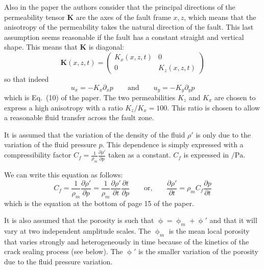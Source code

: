 Also in the paper the authors consider that the principal directions of the permeability
tensor ${\bm K}$ are the axes of the fault frame $x,z$, which means
that the anisotropy of the permeability takes the natural
direction of the fault. This last assumption seems reasonable
if the fault has a constant straight and vertical shape.
This means that ${\bm K}$ is diagonal:
\begin{equation}
{\bm K}(x,z,t) = \left(\begin{array}{cc}
K_x(x,z,t) & 0 \\ 
0 & K_z(x,z,t)
\end{array}\right)
\label{eq:por22}
\end{equation}
so that indeed
\begin{equation}
u_x = -K_x \partial_x p
\qquad
\text{and}
\qquad
u_y = -K_y \partial_y p
\label{eq:por11}
\end{equation}
which is Eq.~(10) of the paper.
The two permeabilities $K_z$ and $K_x$ are chosen to express a high anisotropy with a ratio 
$K_z/K_x =100$. This ratio is chosen to allow a reasonable fluid transfer across the fault zone.

It is assumed that the variation of the density of the fluid $\rho'$ 
is only due to the variation of the fluid pressure $p$. This dependence is simply
expressed with a compressibility factor $C_f = \frac{1}{\rho_m}\frac{\partial \rho'}{\partial p} $
taken as a constant. $C_f$ is expressed in $\si{\per\pascal}$.

We can write this equation as follows:
\begin{equation}
C_f = \frac{1}{\rho_m}\frac{\partial \rho'}{\partial p} = 
\frac{1}{\rho_m}\frac{\partial \rho'}{\partial t}\frac{\partial t}{\partial p}
\qquad
\text{or,}
\qquad
\frac{\partial \rho'}{\partial t} = \rho_m C_f  \frac{\partial p}{\partial t}
\label{eq:por20}
\end{equation}
which is the equation at the bottom of page 15 of the paper.

It is also assumed that the porosity is such that $\upphi=\upphi_m + \upphi'$
and that it will vary at two independent
amplitude scales. The $\upphi_m$ is the mean local porosity that
varies strongly and heterogeneously in time because of the
kinetics of the crack sealing process (see below). The $\upphi'$ is
the smaller variation of the porosity due to the fluid pressure variation.

